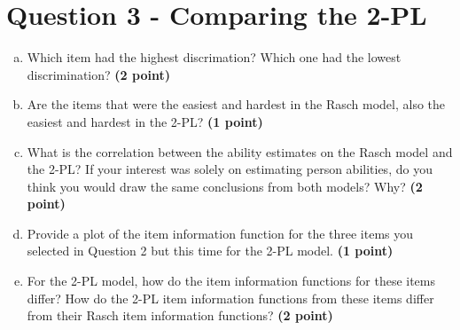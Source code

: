 \documentclass{article}\usepackage[]{graphicx}\usepackage[]{color}
\begin{document}
\section*{Question 3 - Comparing the 2-PL}
\begin{enumerate}[(a)]
     \item Which item had the highest discrimation? Which one had the lowest discrimination? \textbf{(2 point)}
      \item Are the items that were the easiest and hardest in the Rasch model, also the easiest and hardest in the 2-PL? \textbf{(1 point)}
      \item What is the correlation between the ability estimates on the Rasch model and the 2-PL? If your interest was solely on estimating person abilities, do you think you would draw the same conclusions from both models? Why? \textbf{(2 point)} 
      \item Provide a plot of the item information function for the three items you selected in Question 2 but this time for the 2-PL model. \textbf{(1 point)}
    \item For the 2-PL model, how do the item information functions for these items differ? How do the 2-PL item information functions from these items differ from their Rasch item information functions?  \textbf{(2 point)}
\end{enumerate}
\end{document}
